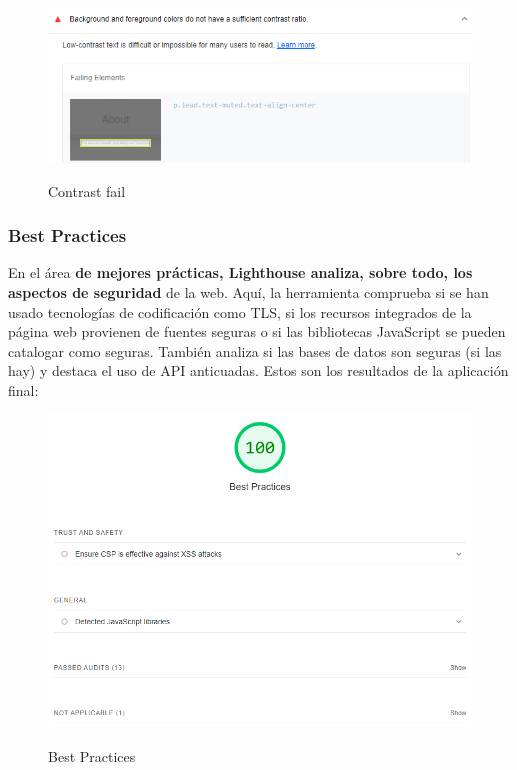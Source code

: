 \documentclass[12pt,twoside,titlepage]{report}
\begin{document}
\begin{figure}[H]
    \centering
    \includegraphics[scale=0.6]{Lighthouse/AccesibilityContrast}
    \label{fig:Lighthouse_contrast}
    \caption{Contrast fail}
\end{figure}

\subsubsection{Best Practices}

En el área \textbf{de mejores prácticas, Lighthouse analiza, sobre todo, los aspectos de seguridad} de la web. Aquí, la herramienta comprueba si se han usado tecnologías de codificación como TLS, si los recursos integrados de la página web provienen de fuentes seguras o si las bibliotecas JavaScript se pueden catalogar como seguras. También analiza si las bases de datos son seguras (si las hay) y destaca el uso de API anticuadas. Estos son los resultados de la aplicación final:

\begin{figure}[H]
    \centering
    \includegraphics[scale=0.6]{Lighthouse/BestPractices}
    \label{fig:Lighthouse_bestpractices}
    \caption{Best Practices}
\end{figure}
\end{document}
